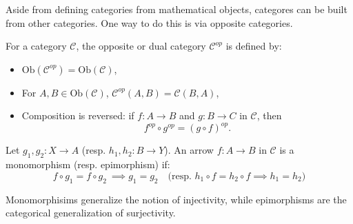 Aside from defining categories from mathematical objects, categores can be built from other categories. One way to do this is via opposite categories.

\begin{definition} For a category $\mathcal{C}$, the opposite or dual category $\mathcal{C}^{op}$ is defined by:
\begin{itemize}
    \item $\mathrm{Ob}(\mathcal{C}^{op}) = \mathrm{Ob}(\mathcal{C})$,
    \item For $A,B \in \mathrm{Ob}(\mathcal{C})$, $\mathcal{C}^{op}(A,B) = \mathcal{C}(B,A)$,
    \item Composition is reversed: if $f : A \to B$ and $g : B \to C$ in $\mathcal{C}$, then
    \[
    f^{op} \circ g^{op} = (g \circ f)^{op}.
    \]
\end{itemize}
\end{definition}






\begin{definition}
  \label{def:monos-epis} Let \( g_1, g_2 : X \to A \) (resp. \( h_1, h_2 : B \to Y \)). An arrow \( f : A \to B \) in \( \mathcal{C} \) is a monomorphism (resp. epimorphism) if:
\[
  f \circ g_1 = f \circ g_2 \ \implies g_1 = g_2 \quad \text{(resp. } h_1 \circ f = h_2 \circ f \implies h_1 = h_2 \text{)}
\]

\end{definition}

\begin{note}
  Monomorphisims generalize the notion of injectivity, while epimorphisms are the categorical generalization of surjectivity.
\end{note}




